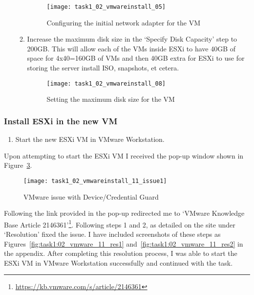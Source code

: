 \begin{enumerate}[resume*=task1methodology]
\begin{enumerate}[label=(\alph*)]
        \begin{figure}[H]
          \centering
          \captionsetup{skip=2pt}
          \texttt{[image: task1\_02\_vmwareinstall\_05]}
          \caption{Configuring the initial network adapter for the VM}
          \label{fig:task1:02_vmwarewiz_05}
        \end{figure}
      \item Increase the maximum disk size in the `Specify Disk Capacity' step to 200GB. This will allow each of the VMs inside ESXi to have 40GB of space for 4x40=160GB of VMs and then 40GB extra for ESXi to use for storing the server install ISO, snapshots, et cetera.
        \begin{figure}[H]
          \centering
          \captionsetup{skip=2pt}
          \texttt{[image: task1\_02\_vmwareinstall\_08]}
          \caption{Setting the maximum disk size for the VM}
          \label{fig:task1:02_vmwarewiz_08}
        \end{figure}
    \end{enumerate}
\end{enumerate}

\subsubsection{Install ESXi in the new VM}
\begin{enumerate}[resume*=task1methodology]
  \item Start the new ESXi VM in VMware Workstation.
\end{enumerate}

\noindent Upon attempting to start the ESXi VM I received the pop-up window shown in Figure~\ref{fig:task1:02_vmwarewiz_11_issue}.

\begin{figure}[H]
  \centering
  \captionsetup{skip=2pt}
  \texttt{[image: task1\_02\_vmwareinstall\_11\_issue1]}
  \caption{VMware issue with Device/Credential Guard}
  \label{fig:task1:02_vmwarewiz_11_issue}
\end{figure}

\noindent Following the link provided in the pop-up redirected me to `VMware Knowledge Base Article 2146361'\footnote{\url{https://kb.vmware.com/s/article/2146361}}. Following steps 1 and 2, as detailed on the site under `Resolution' fixed the issue. I have included screenshots of these steps as Figures~\ref{fig:task1:02_vmware_11_res1} and~\ref{fig:task1:02_vmware_11_res2} in the  appendix. After completing this resolution process, I was able to start the ESXi VM in VMware Workstation successfully and continued with the task.

